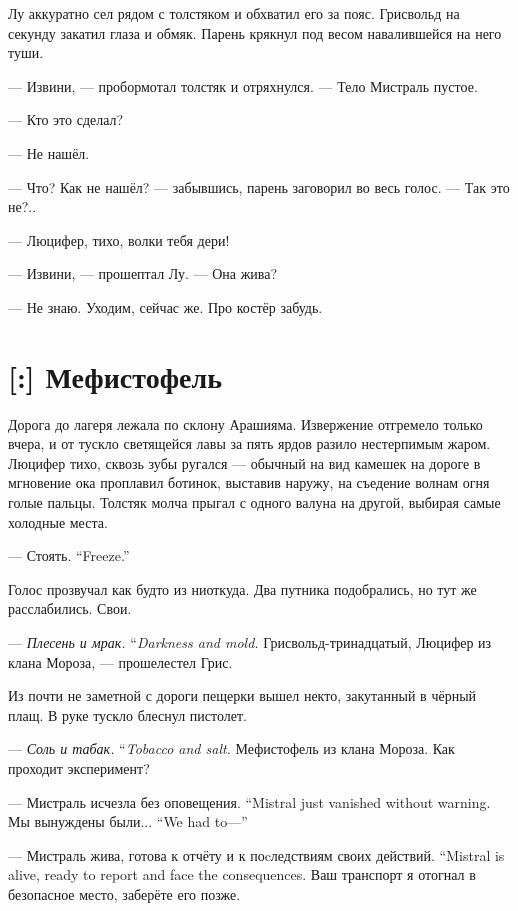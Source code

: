 Лу аккуратно сел рядом с толстяком и обхватил его за пояс.
Грисвольд на секунду закатил глаза и обмяк.
Парень крякнул под весом навалившейся на него туши.

--- Извини, --- пробормотал толстяк и отряхнулся.
--- Тело Мистраль пустое.

--- Кто это сделал?

--- Не нашёл.

--- Что?
Как не нашёл? --- забывшись, парень заговорил во весь голос.
--- Так это не?..

--- Люцифер, тихо, волки тебя дери!

--- Извини, --- прошептал Лу.
--- Она жива?

--- Не знаю.
Уходим, сейчас же.
Про костёр забудь.

\section{[:] Мефистофель}

Дорога до лагеря лежала по склону Арашияма.
Извержение отгремело только вчера, и от тускло светящейся лавы за пять ярдов разило нестерпимым жаром.
Люцифер тихо, сквозь зубы ругался --- обычный на вид камешек на дороге в мгновение ока проплавил ботинок, выставив наружу, на съедение волнам огня голые пальцы.
Толстяк молча прыгал с одного валуна на другой, выбирая самые холодные места.

{--- Стоять.}
{``Freeze.''}

Голос прозвучал как будто из ниоткуда.
Два путника подобрались, но тут же расслабились.
Свои.

{--- \emph{Плесень и мрак.}}
{``\emph{Darkness and mold.}}
Грисвольд-тринадцатый, Люцифер из клана Мороза, --- прошелестел Грис.

Из почти не заметной с дороги пещерки вышел некто, закутанный в чёрный плащ.
В руке тускло блеснул пистолет.

{--- \emph{Соль и табак.}}
{``\emph{Tobacco and salt.}}
Мефистофель из клана Мороза.
Как проходит эксперимент?

{--- Мистраль исчезла без оповещения.}
{``Mistral just vanished without warning.}
{Мы вынуждены были...}
{``We had to---''}

{--- Мистраль жива, готова к отчёту и к поcледствиям своих действий.}
{``Mistral is alive, ready to report and face the consequences.}
Ваш транспорт я отогнал в безопасное место, заберёте его позже.

